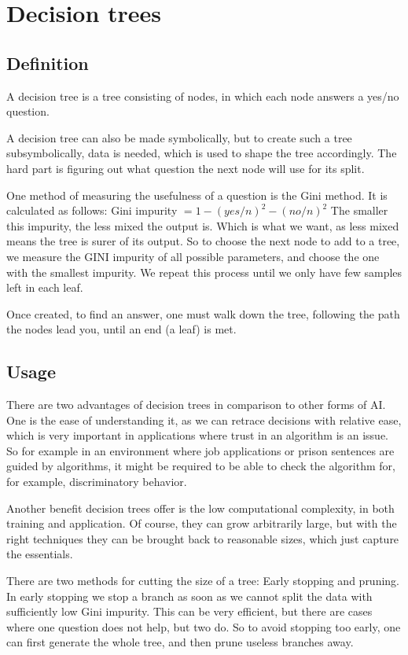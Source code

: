 \section{Decision trees}
\label{sec:decisionTrees}
\subsection{Definition}

A decision tree is a tree consisting of nodes, in which each node answers a yes/no question. 

A decision tree can also be made symbolically, but to create such a tree  subsymbolically, data is needed, which is used to shape the tree accordingly.
The hard part is figuring out what question the next node will use for its split. 

One method of measuring the usefulness of a question is the Gini method.
It is calculated as follows: Gini impurity $= 1-(yes/n)^2-(no/n)^2$
The smaller this impurity, the less mixed the output is. Which is what we want, as less mixed means the tree is surer of its output. 
So to choose the next node to add to a tree, we measure the GINI impurity of all possible parameters, and choose the one with the smallest impurity. We repeat this process until we only have few samples left in each leaf. %

Once created, to find an answer, one must walk down the tree, following the path the nodes lead you, until an end (a leaf) is met.

\subsection{Usage}
There are two advantages of decision trees in comparison to other forms of AI. One is the ease of understanding it, as we can retrace decisions with relative ease, which is very important in applications where trust in an algorithm is an issue. So for example in an environment where job applications or prison sentences are guided by algorithms, it might be required to be able to check the algorithm for, for example, discriminatory behavior.

Another benefit decision trees offer is the low computational complexity, in both training and application. Of course, they can grow arbitrarily large, but with the right techniques they can be brought back to reasonable sizes, which just capture the essentials.

There are two methods for cutting the size of a tree: Early stopping and pruning. In early stopping we stop a branch as soon as we cannot split the data with sufficiently low Gini impurity. This can be very efficient, but there are cases where one question does not help, but two do. %
So to avoid stopping too early, one can first generate the whole tree, and then prune useless branches away.

